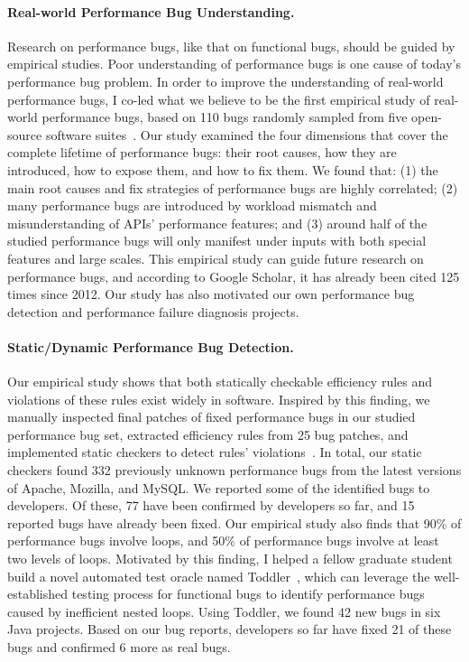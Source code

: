 \documentclass[10pt]{article}
\begin{document}
\paragraph{Real-world Performance Bug Understanding.}
Research on performance bugs, like that on functional bugs, should  be guided by empirical studies. 
Poor understanding of performance bugs is one cause of today's performance bug problem. 
In order to improve the understanding of real-world performance bugs, 
I co-led what we believe to be the first 
empirical study of real-world performance bugs, based on 110 bugs randomly sampled from five open-source software suites~\cite{jin12perfbug}. 
Our study examined the four dimensions that cover the complete lifetime of performance bugs:
their root causes, 
how they are introduced, how to expose them, and how to fix them. 
We found that: 
(1) the main root causes and fix strategies of performance bugs are highly correlated; 
(2) many performance bugs are introduced by workload mismatch and misunderstanding of APIs' performance features; 
and (3) around half of the studied performance bugs will only manifest under inputs with both special features and large scales. 
This empirical study can guide future research on performance bugs,
and according to Google Scholar, it has already been cited 125 times since 2012. 
Our study has also motivated our own performance bug detection and performance failure diagnosis projects.

\vspace{-.1in}
\paragraph{Static/Dynamic Performance Bug Detection.}
Our empirical study shows that both statically checkable efficiency rules and violations of these rules exist widely in software. 
Inspired by this finding,
we manually inspected final patches of fixed performance bugs in our studied performance bug set, 
extracted efficiency rules from 25 bug patches, 
and implemented static checkers to detect rules' violations~\cite{jin12perfbug}. 
In total, our static checkers found 332 previously unknown performance bugs from the latest versions of Apache, Mozilla, and MySQL. 
We reported some of the identified bugs to developers. 
Of these, 77 have  been confirmed by developers so far, and 15 reported bugs have already been fixed.
Our empirical study also finds that 90\% of performance bugs involve loops, 
and 50\% of performance bugs involve at least two levels of loops. 
Motivated by this finding, I helped a fellow graduate student build a novel automated test oracle named Toddler~\cite{Nistor13ICSE},
which can leverage the well-established testing process for functional bugs to identify performance bugs caused by inefficient nested loops. 
Using Toddler, we found 42 new bugs in six Java projects.
Based on our bug reports, developers so far have fixed 21 of these bugs and confirmed 6 more as real bugs.
\end{document}
